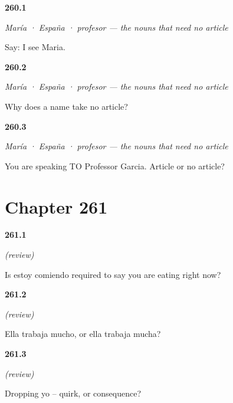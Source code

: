 \noindent\begin{minipage}[t]{\linewidth}
\raggedright
\hypertarget{review-ES-C66-nombres-propios-name}{\textbf{260.1}} \emph{María · España · profesor — the nouns that need no article}\par
\small Say: I see Maria.
\end{minipage}\par\medskip

\noindent\begin{minipage}[t]{\linewidth}
\raggedright
\hypertarget{review-ES-C66-nombres-propios-why}{\textbf{260.2}} \emph{María · España · profesor — the nouns that need no article}\par
\small Why does a name take no article?
\end{minipage}\par\medskip

\noindent\begin{minipage}[t]{\linewidth}
\raggedright
\hypertarget{review-ES-C66-nombres-propios-title}{\textbf{260.3}} \emph{María · España · profesor — the nouns that need no article}\par
\small You are speaking TO Professor Garcia. Article or no article?
\end{minipage}\par\medskip

\section*{Chapter 261}

\noindent\begin{minipage}[t]{\linewidth}
\raggedright
\hypertarget{review-ES-C66-repaso-lo-implicito-prog}{\textbf{261.1}} \emph{(review)}\par
\small Is estoy comiendo required to say you are eating right now?
\end{minipage}\par\medskip

\noindent\begin{minipage}[t]{\linewidth}
\raggedright
\hypertarget{review-ES-C66-repaso-lo-implicito-quant}{\textbf{261.2}} \emph{(review)}\par
\small Ella trabaja mucho, or ella trabaja mucha?
\end{minipage}\par\medskip

\noindent\begin{minipage}[t]{\linewidth}
\raggedright
\hypertarget{review-ES-C66-repaso-lo-implicito-drop}{\textbf{261.3}} \emph{(review)}\par
\small Dropping yo -- quirk, or consequence?
\end{minipage}\par\medskip

